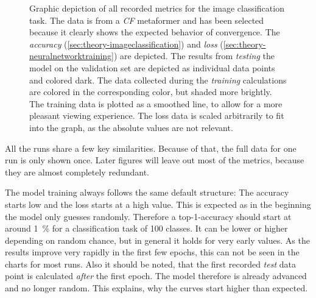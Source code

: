 \begin{figure}[htbp]
    \centering
    \caption{Graphic depiction of all recorded metrics for the image classification task.
    The data is from a \emph{CF} metaformer and has been selected because it clearly shows the expected behavior of convergence.
    The \emph{accuracy} (\autoref{sec:theory-imageclassification}) and \emph{loss} (\autoref{sec:theory-neuralnetworktraining}) are depicted. 
    The results from \emph{testing} the model on the validation set are depicted as individual data points and colored dark. 
    The data collected during the \emph{training} calculations are colored in the corresponding color, but shaded more brightly. The training data is plotted as a smoothed line, to allow for a more pleasant viewing experience.
    The loss data is scaled arbitrarily to fit into the graph, as the absolute values are not relevant. }
    \label{fig:comparison-recorded-values}
\end{figure}

All the runs share a few key similarities. Because of that, the full data for one run is only shown once. 
Later figures will leave out most of the metrics, because they are almost completely redundant.

The model training always follows the same default structure: The accuracy starts low and the loss starts at a high value.
This is expected as in the beginning the model only guesses randomly. 
Therefore a top-1-accuracy should start at around \SI[]{1}[]{\percent} for a classification task of 100 classes.
It can be lower or higher depending on random chance, but in general it holds for very early values. 
As the results improve very rapidly in the first few epochs, this can not be seen in the charts for most runs.
Also it should be noted, that the first recorded \emph{test} data point is calculated \emph{after} the first epoch. 
The model therefore is already advanced and no longer random. 
This explains, why the curves start higher than expected.

